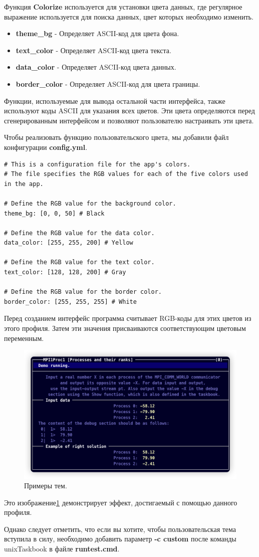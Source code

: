 Функция \textbf{Colorize} используется для установки цвета данных, где регулярное выражение используется для поиска данных, цвет которых необходимо изменить.

\begin{itemize}
    \item \textbf{theme\_bg} - Определяет ASCII-код для цвета фона.
    \item \textbf{text\_color} - Определяет ASCII-код цвета текста.
    \item \textbf{data\_color} - Определяет ASCII-код цвета данных.
    \item \textbf{border\_color} - Определяет ASCII-код для цвета границы.
\end{itemize}

Функции, используемые для вывода остальной части интерфейса, также используют коды ASCII для указания всех цветов. Эти цвета определяются перед сгенерированным интерфейсом и позволяют пользователю настраивать эти цвета.

Чтобы реализовать функцию пользовательского цвета, мы добавили файл конфигурации \textbf{config.yml}.

\lstset{language=bash}
\begin{lstlisting}
# This is a configuration file for the app's colors.
# The file specifies the RGB values for each of the five colors used in the app.

# Define the RGB value for the background color.
theme_bg: [0, 0, 50] # Black

# Define the RGB value for the data color.
data_color: [255, 255, 200] # Yellow

# Define the RGB value for the text color.
text_color: [128, 128, 200] # Gray

# Define the RGB value for the border color.
border_color: [255, 255, 255] # White
\end{lstlisting}

Перед созданием интерфейс программа считывает RGB-коды для этих цветов из этого профиля. Затем эти значения присваиваются соответствующим цветовым переменным.

\begin{figure}[htbp]%
    \centering
    \includegraphics[width=0.9\linewidth]{images/color_example.jpg}%
    \caption{Примеры тем.}%
    \label{theme}%
\end{figure}

Это изображение\ref{theme} демонстрирует эффект, достигаемый с помощью данного профиля.

Однако следует отметить, что если вы хотите, чтобы пользовательская тема вступила в силу, необходимо добавить параметр \textbf{-c custom} после команды unixTaskbook в файле \textbf{runtest.cmd}.

